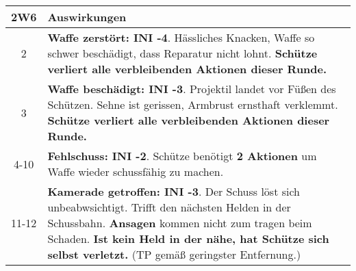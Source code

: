 {\begin{center}
    \begin{tabularx}{\linewidth}{cX}
        \hline
        \textbf{2W6}& \textbf{Auswirkungen}\\
        \hline
        2& \textbf{Waffe zerstört: INI -4}. Hässliches Knacken, Waffe so schwer
        beschädigt, dass Reparatur nicht lohnt. \textbf{Schütze verliert alle
        verbleibenden Aktionen dieser Runde.}\\
        \hline
        3& \textbf{Waffe beschädigt: INI -3}. Projektil landet vor Füßen des
        Schützen. Sehne ist gerissen, Armbrust ernsthaft verklemmt.
        \textbf{Schütze verliert alle verbleibenden Aktionen dieser Runde.}\\
        \hline
        4-10& \textbf{Fehlschuss: INI -2}. Schütze benötigt \textbf{2 Aktionen} um Waffe wieder schussfähig zu machen.\\
        \hline
        11-12& \textbf{Kamerade getroffen: INI -3}. Der Schuss löst sich
        unbeabwsichtigt. Trifft den nächsten Helden in der Schussbahn.
        \textbf{Ansagen} kommen nicht zum tragen beim Schaden. \textbf{Ist
        kein Held in der nähe, hat Schütze sich selbst verletzt.} (TP gemäß
        geringster Entfernung.)\\
        \hline
    \end{tabularx}
\end{center}
}